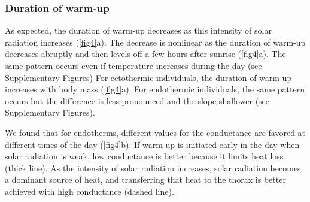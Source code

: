 \subsubsection*{Duration of warm-up}
As expected, the duration of warm-up decreases as this intensity of solar radiation increases (\cref{fig4}a).
The decrease is nonlinear as the duration of  warm-up decreases abruptly and then levels off a few hours after sunrise (\cref{fig4}a).
The same pattern occurs even if temperature increases during the day (see Supplementary Figures)
For ectothermic individuals, the duration of warm-up increases with body mass (\cref{fig4}a).
For endothermic individuals, the same pattern occurs but the difference is less pronounced and the slope shallower (see Supplementary Figures).

We found that for endotherms, different values for the conductance are favored at different times of the day (\cref{fig4}b).
If warm-up is initiated early in the day when solar radiation is weak, low conductance is better because it limits heat loss (thick line).
As the intensity of solar radiation increases, solar radiation becomes a dominant source of heat, and transferring that heat to the thorax is better achieved with high conductance (dashed line).

